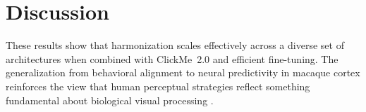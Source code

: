 \documentclass[submission]{ccn}
\begin{document}

\section{Discussion}

These results show that harmonization scales effectively across a diverse set of architectures when combined with ClickMe~2.0 and efficient fine-tuning. The generalization from behavioral alignment to neural predictivity in macaque cortex reinforces the view that human perceptual strategies reflect something fundamental about biological visual processing \citep{LinsleyFengSerreTICS}.

\printbibliography
\end{document}
